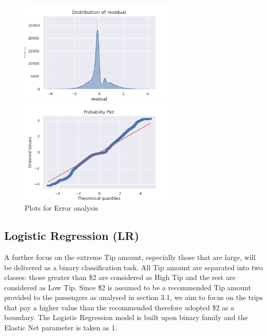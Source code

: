 \documentclass[11pt]{article}
\begin{document}
\begin{figure}[h!]
   \begin{minipage}{0.5\textwidth}
     \centering
     \includegraphics[width=\linewidth, height = 5cm]{Distribution of residual.png}
   \end{minipage}\hfill
   \begin{minipage}{0.5\textwidth}
     \centering
     \includegraphics[width=\linewidth, height = 5cm]{QQ plot.png}
   \end{minipage}
   \caption{Plots for Error analysis}
   \label{fig:6}
\end{figure}


\subsection{Logistic Regression (LR)}
A further focus on the extreme Tip amount, especially those that are large, will be delivered as a binary classification task. All Tip amount are separated into two classes: those greater than \$2 are considered as High Tip and the rest are considered as Low Tip. Since \$2 is assumed to be a recommended Tip amount provided to the passengers as analysed in section 3.1, we aim to focus on the trips that pay a higher value than the recommended therefore adopted \$2 as a boundary. The Logistic Regression model is built upon binary family and the Elastic Net parameter is taken as 1.
\end{document}
